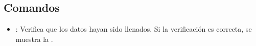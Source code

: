 \subsection{Comandos}

\begin{itemize}
	\item {}: Verifica que los datos hayan sido llenados. Si la verificación es correcta, se muestra la .
\end{itemize}

